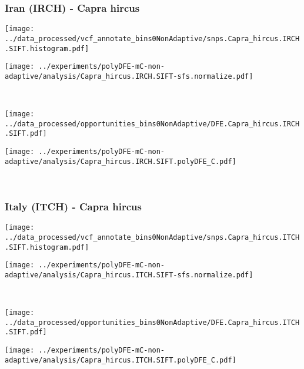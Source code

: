 \subsubsection{Iran (IRCH) - Capra hircus}

\begin{minipage}{0.49\linewidth}
    \texttt{[image: ../data\_processed/vcf\_annotate\_bins0NonAdaptive/snps.Capra\_hircus.IRCH.SIFT.histogram.pdf]}
\end{minipage}
\begin{minipage}{0.49\linewidth}
    \texttt{[image: ../experiments/polyDFE-mC-non-adaptive/analysis/Capra\_hircus.IRCH.SIFT-sfs.normalize.pdf]}
\end{minipage}
\\
\begin{minipage}{0.49\linewidth}
    \texttt{[image: ../data\_processed/opportunities\_bins0NonAdaptive/DFE.Capra\_hircus.IRCH.SIFT.pdf]}
\end{minipage}
\begin{minipage}{0.49\linewidth}
    \texttt{[image: ../experiments/polyDFE-mC-non-adaptive/analysis/Capra\_hircus.IRCH.SIFT.polyDFE\_C.pdf]}
\end{minipage}
\\

\subsubsection{Italy (ITCH) - Capra hircus}

\begin{minipage}{0.49\linewidth}
    \texttt{[image: ../data\_processed/vcf\_annotate\_bins0NonAdaptive/snps.Capra\_hircus.ITCH.SIFT.histogram.pdf]}
\end{minipage}
\begin{minipage}{0.49\linewidth}
    \texttt{[image: ../experiments/polyDFE-mC-non-adaptive/analysis/Capra\_hircus.ITCH.SIFT-sfs.normalize.pdf]}
\end{minipage}
\\
\begin{minipage}{0.49\linewidth}
    \texttt{[image: ../data\_processed/opportunities\_bins0NonAdaptive/DFE.Capra\_hircus.ITCH.SIFT.pdf]}
\end{minipage}
\begin{minipage}{0.49\linewidth}
    \texttt{[image: ../experiments/polyDFE-mC-non-adaptive/analysis/Capra\_hircus.ITCH.SIFT.polyDFE\_C.pdf]}
\end{minipage}
\\

